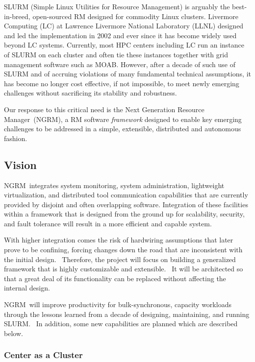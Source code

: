 \documentclass{article}
\newcommand{\ngrm}{NGRM}
\newcommand{\ngrmfull}{Next Generation Resource Manager}
\begin{document}
SLURM\cite{SlurmDesign} (Simple Linux Utilities for Resource Management) is arguably the
best-in-breed, open-sourced RM designed for commodity Linux clusters.
Livermore Computing (LC) at Lawrence Livermore National Laboratory (LLNL)
designed and led the implementation in 2002 and ever since it has become
widely used beyond LC systems. Currently, most HPC centers including LC
run an instance of SLURM on each cluster and often tie these instances
together with grid management software such as MOAB.  However, after a
decade of such use of SLURM and of accruing violations of many fundamental
technical assumptions, it has become no longer cost effective, if not
impossible, to meet newly emerging challenges without sacrificing its
stability and robustness.

Our response to this critical need is the \ngrmfull\ (\ngrm ), a RM software
{\em framework} designed to enable key emerging challenges to be addressed
in a simple, extensible, distributed and autonomous fashion.

\subsection{Vision}
\ngrm\ integrates system monitoring, system administration, lightweight
virtualization, and distributed tool communication capabilities that are
currently provided by disjoint and often overlapping software.
Integration of these facilities within a framework that is designed from
the ground up for scalability, security, and fault tolerance will result
in a more efficient and capable system.

With higher integration comes the risk of hardwiring assumptions that
later prove to be confining, forcing changes down the road that are
inconsistent with the initial design.  Therefore, the project will focus
on building a generalized framework that is highly customizable and
extensible.  It will be architected so that a great deal of its
functionality can be replaced without affecting the internal design.

\ngrm\ will improve productivity for bulk-synchronous, capacity workloads
through the lessons learned from a decade of designing, maintaining,
and running SLURM.  In addition, some new capabilities are planned which
are described below.

\subsubsection{Center as a Cluster}
\end{document}
